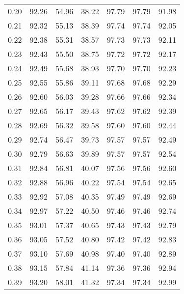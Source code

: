 \begin{tabular}{|c|c|c|c|c|c|c|}
      0.20 &     92.26 &     54.96 &      38.22 &   97.79 &      97.79 &         91.98 \\
      0.21 &     92.32 &     55.13 &      38.39 &   97.74 &      97.74 &         92.05 \\
      0.22 &     92.38 &     55.31 &      38.57 &   97.73 &      97.73 &         92.11 \\
      0.23 &     92.43 &     55.50 &      38.75 &   97.72 &      97.72 &         92.17 \\
      0.24 &     92.49 &     55.68 &      38.93 &   97.70 &      97.70 &         92.23 \\
      0.25 &     92.55 &     55.86 &      39.11 &   97.68 &      97.68 &         92.29 \\
      0.26 &     92.60 &     56.03 &      39.28 &   97.66 &      97.66 &         92.34 \\
      0.27 &     92.65 &     56.17 &      39.43 &   97.62 &      97.62 &         92.39 \\
      0.28 &     92.69 &     56.32 &      39.58 &   97.60 &      97.60 &         92.44 \\
      0.29 &     92.74 &     56.47 &      39.73 &   97.57 &      97.57 &         92.49 \\
      0.30 &     92.79 &     56.63 &      39.89 &   97.57 &      97.57 &         92.54 \\
      0.31 &     92.84 &     56.81 &      40.07 &   97.56 &      97.56 &         92.60 \\
      0.32 &     92.88 &     56.96 &      40.22 &   97.54 &      97.54 &         92.65 \\
      0.33 &     92.92 &     57.08 &      40.35 &   97.49 &      97.49 &         92.69 \\
      0.34 &     92.97 &     57.22 &      40.50 &   97.46 &      97.46 &         92.74 \\
      0.35 &     93.01 &     57.37 &      40.65 &   97.43 &      97.43 &         92.79 \\
      0.36 &     93.05 &     57.52 &      40.80 &   97.42 &      97.42 &         92.83 \\
      0.37 &     93.10 &     57.69 &      40.98 &   97.40 &      97.40 &         92.89 \\
      0.38 &     93.15 &     57.84 &      41.14 &   97.36 &      97.36 &         92.94 \\
      0.39 &     93.20 &     58.01 &      41.32 &   97.34 &      97.34 &         92.99 \\

\end{tabular}
